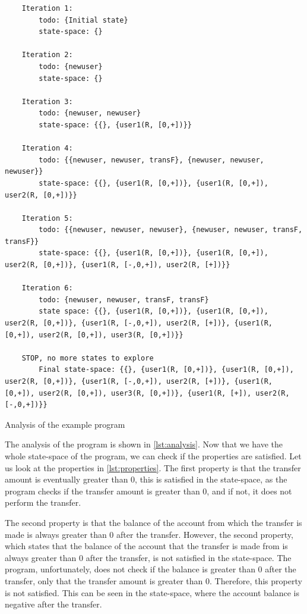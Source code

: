 \begin{listing}[htb!]
    \begin{verbatim}
    Iteration 1:
        todo: {Initial state}
        state-space: {}

    Iteration 2:
        todo: {newuser}
        state-space: {}

    Iteration 3:
        todo: {newuser, newuser}
        state-space: {{}, {user1(R, [0,+])}}

    Iteration 4:
        todo: {{newuser, newuser, transF}, {newuser, newuser, newuser}}
        state-space: {{}, {user1(R, [0,+])}, {user1(R, [0,+]), user2(R, [0,+])}}

    Iteration 5:
        todo: {{newuser, newuser, newuser}, {newuser, newuser, transF, transF}}
        state-space: {{}, {user1(R, [0,+])}, {user1(R, [0,+]), user2(R, [0,+])}, {user1(R, [-,0,+]), user2(R, [+])}}

    Iteration 6:
        todo: {newuser, newuser, transF, transF}
        state space: {{}, {user1(R, [0,+])}, {user1(R, [0,+]), user2(R, [0,+])}, {user1(R, [-,0,+]), user2(R, [+])}, {user1(R, [0,+]), user2(R, [0,+]), user3(R, [0,+])}}

    STOP, no more states to explore
        Final state-space: {{}, {user1(R, [0,+])}, {user1(R, [0,+]), user2(R, [0,+])}, {user1(R, [-,0,+]), user2(R, [+])}, {user1(R, [0,+]), user2(R, [0,+]), user3(R, [0,+])}, {user1(R, [+]), user2(R, [-,0,+])}}
    \end{verbatim}
\caption{Analysis of the example program}
\label{lst:analysis}
\end{listing}


The analysis of the program is shown in \autoref{lst:analysis}.
Now that we have the whole state-space of the program, we can check if the properties are satisfied.
Let us look at the properties in \autoref{lst:properties}.
The first property is that the transfer amount is eventually greater than 0, this is satisfied in the state-space, as the program checks if the transfer amount is greater than 0, and if not, it does not perform the transfer.

The second property is that the balance of the account from which the transfer is made is always greater than 0 after the transfer.
However, the second property, which states that the balance of the account that the transfer is made from is always greater than 0 after the transfer, is not satisfied in the state-space.
The program, unfortunately, does not check if the balance is greater than 0 after the transfer, only that the transfer amount is greater than 0.
Therefore, this property is not satisfied.
This can be seen in the state-space, where the account balance is negative after the transfer.
